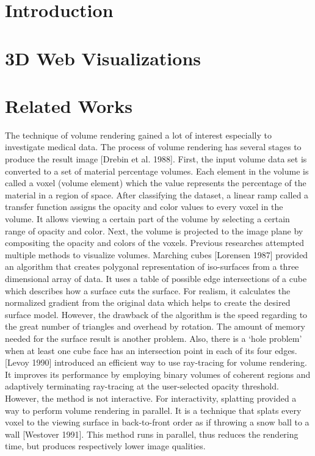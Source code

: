 \documentclass{acm_proc_article-sp}
\begin{document}
\maketitle
\begin{abstract}
\end{abstract}


\section{Introduction}


\section{3D Web Visualizations}

\section{Related Works}
The technique of volume rendering gained a lot of interest especially to investigate medical data. The process of volume rendering has several stages to produce the result image [Drebin et al. 1988]. First, the input volume data set is converted to a set of material percentage volumes. Each element in the volume is called a voxel (volume element) which the value represents the percentage of the material in a region of space. After classifying the dataset, a linear ramp called a transfer function assigns the opacity and color values to every voxel in the volume. It allows viewing a certain part of the volume by selecting a certain range of opacity and color. Next, the volume is projected to the image plane by compositing the opacity and colors of the voxels.
Previous researches attempted multiple methods to visualize volumes. Marching cubes [Lorensen 1987] provided an algorithm that creates polygonal representation of iso-surfaces from a three dimensional array of data. It uses a table of possible edge intersections of a cube which describes how a surface cuts the surface. For realism, it calculates the normalized gradient from the original data which helps to create the desired surface model. However, the drawback of the algorithm is the speed regarding to the great number of triangles and overhead by rotation. The amount of memory needed for the surface result is another problem. Also, there is a ‘hole problem’ when at least one cube face has an intersection point in each of its four edges.
[Levoy 1990] introduced an efficient way to use ray-tracing for volume rendering. It improves its performance by employing binary volumes of coherent regions and adaptively terminating ray-tracing at the user-selected opacity threshold. However, the method is not interactive.
For interactivity, splatting provided a way to perform volume rendering in parallel. It is a technique that splats every voxel to the viewing surface in back-to-front order as if throwing a snow ball to a wall [Westover 1991]. This method runs in parallel, thus reduces the rendering time, but produces respectively lower image qualities. 
\end{document}
